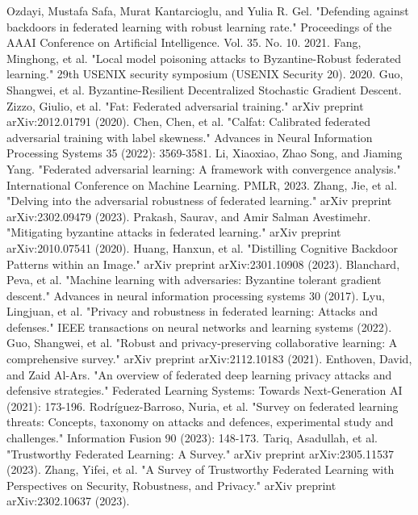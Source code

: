 \documentclass[conference]{IEEEtran}
\begin{document}
\begin{thebibliography}{00}
     Ozdayi, Mustafa Safa, Murat Kantarcioglu, and Yulia R. Gel. "Defending against backdoors in federated learning with robust learning rate." Proceedings of the AAAI Conference on Artificial Intelligence. Vol. 35. No. 10. 2021.
     Fang, Minghong, et al. "Local model poisoning attacks to {Byzantine-Robust} federated learning." 29th USENIX security symposium (USENIX Security 20). 2020.
     Guo, Shangwei, et al. Byzantine-Resilient Decentralized Stochastic Gradient Descent.
     Zizzo, Giulio, et al. "Fat: Federated adversarial training." arXiv preprint arXiv:2012.01791 (2020).
     Chen, Chen, et al. "Calfat: Calibrated federated adversarial training with label skewness." Advances in Neural Information Processing Systems 35 (2022): 3569-3581.
     Li, Xiaoxiao, Zhao Song, and Jiaming Yang. "Federated adversarial learning: A framework with convergence analysis." International Conference on Machine Learning. PMLR, 2023.
     Zhang, Jie, et al. "Delving into the adversarial robustness of federated learning." arXiv preprint arXiv:2302.09479 (2023).
     Prakash, Saurav, and Amir Salman Avestimehr. "Mitigating byzantine attacks in federated learning." arXiv preprint arXiv:2010.07541 (2020).
     Huang, Hanxun, et al. "Distilling Cognitive Backdoor Patterns within an Image." arXiv preprint arXiv:2301.10908 (2023).
     Blanchard, Peva, et al. "Machine learning with adversaries: Byzantine tolerant gradient descent." Advances in neural information processing systems 30 (2017).
     Lyu, Lingjuan, et al. "Privacy and robustness in federated learning: Attacks and defenses." IEEE transactions on neural networks and learning systems (2022).
     Guo, Shangwei, et al. "Robust and privacy-preserving collaborative learning: A comprehensive survey." arXiv preprint arXiv:2112.10183 (2021).
     Enthoven, David, and Zaid Al-Ars. "An overview of federated deep learning privacy attacks and defensive strategies." Federated Learning Systems: Towards Next-Generation AI (2021): 173-196.
     Rodríguez-Barroso, Nuria, et al. "Survey on federated learning threats: Concepts, taxonomy on attacks and defences, experimental study and challenges." Information Fusion 90 (2023): 148-173.
     Tariq, Asadullah, et al. "Trustworthy Federated Learning: A Survey." arXiv preprint arXiv:2305.11537 (2023).
     Zhang, Yifei, et al. "A Survey of Trustworthy Federated Learning with Perspectives on Security, Robustness, and Privacy." arXiv preprint arXiv:2302.10637 (2023).

\end{thebibliography}
\end{document}
